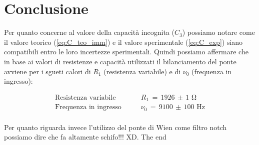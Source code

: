 \section*{Conclusione}

Per quanto concerne al valore della capacità incognita ($C_3$) possiamo notare come il valore teorico (\ref{eq:C_teo_imm}) e il valore sperimentale (\ref{eq:C_exp}) siano compatibili entro le loro incertezze sperimentali. Quindi possiamo affermare che in base ai valori di resistenze e capacità utilizzati il bilanciamento del ponte avviene per i sgueti calori di $R_1$ (resistenza variabile) e di $\nu_0$ (frequenza in ingresso):

\begin{align*}
	\text{Resistenza variabile}& \qquad R_1 \,=\, 1926 \,\pm\, 1 \,\,\si{\ohm} \\
	\text{Frequenza in ingresso}& \qquad \nu_0 \,=\, 9100 \,\pm\, 100 \,\,\si{\hertz} \\
\end{align*}

Per quanto riguarda invece l'utilizzo del ponte di Wien come filtro notch possiamo dire che fa altamente schifo!!! XD.
\newline
\newline
The end
